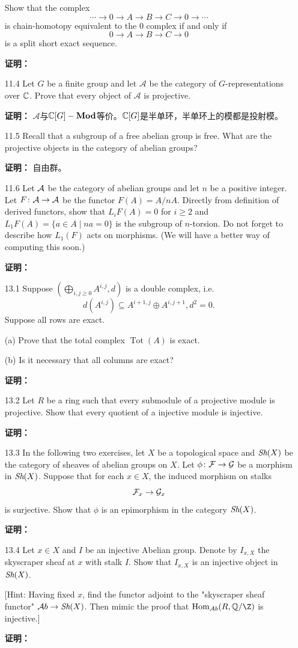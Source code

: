 \begin{enumerate}
Show that the complex\[\cdots \to 0 \to A \to B \to C \to 0 \to \cdots\]is chain-homotopy equivalent to the $0$ complex if and only if
\[0 \to A \to B \to C \to 0\]is a split short exact sequence.
    \item[\textbf{证明：}]
    \item[11.4] Let $G$ be a finite group and let $\mathcal{A}$ be the category of $G$-representations over
$\mathbb{C}$. Prove that every object of $\mathcal{A}$ is projective.
    \item[\textbf{证明：}]$\mathcal{A}$与$\mathbb{C}[G]-\textbf{Mod}$等价。$\mathbb{C}[G]$是半单环，半单环上的模都是投射模。
    \item[11.5]Recall that a subgroup of a free abelian group is free. What are the
projective objects in the category of abelian groups?
    \item[\textbf{证明：}]自由群。
    \item[11.6]Let $\mathcal{A}$ be the category of abelian groups and let $n$ be a positive integer.
Let $F \colon \mathcal{A} \to \mathcal{A}$ be the functor $F(A) = A/nA$. Directly from definition
of derived functors, show that $L_i F(A) = 0$ for $i \geqslant 2$ and $L_1F(A) = \{a \in
A \mid na = 0\}$ is the subgroup of $n$-torsion. Do not forget to describe how
$L_1(F)$ acts on morphisms. (We will have a better way of computing this
soon.)
    \item[\textbf{证明：}]
    \item[13.1] Suppose $(\bigoplus\limits_{i,j \geqslant 0}A^{i,j},d)$ is a double complex, i.e.
    \[d(A^{i,j}) \subseteq A^{i+1,j} \oplus A^{i,j+1},d^2 = 0.\]
    Suppose all rows are exact.

    (a) Prove that the total complex $\operatorname{Tot}(A)$ is exact.

    (b) Is it necessary that all columns are exact?
    \item[\textbf{证明：}]
    \item[13.2] Let $R$ be a ring such that every submodule of a projective module is
projective. Show that every quotient of a injective module is injective.
    \item[\textbf{证明：}]
    \item[13.3] In the following two exercises, let $X$ be a topological space and $\textit{Sh}(X)$ be the category of sheaves
of abelian groups on $X$. Let $\phi \colon \mathcal{F} \to \mathcal{G}$ be a morphism in $\textit{Sh}(X)$. Suppose that for each $x \in X$, the
induced morphism on stalks\[\mathcal{F}_x \to \mathcal{G}_x\]is surjective. Show that $\phi$ is an epimorphism
in the category $\textit{Sh}(X)$.
    \item[\textbf{证明：}]
    \item[13.4] Let $x \in X$ and $I$ be an injective Abelian group. Denote by $I_{x,X}$ the
    skyscraper sheaf at $x$ with stalk $I$. Show that $I_{x,X}$ is an injective object in $\textit{Sh}(X)$.

    [Hint: Having fixed $x$, find the functor adjoint to the "skyscraper sheaf functor" $\mathcal{A}b \to \textit{Sh}(X)$.
     Then mimic the proof that $\Hom_{\mathcal{A}b}(R,\mathbb{Q}/\Z)$ is injective.]
     \item[\textbf{证明：}]
\end{enumerate}